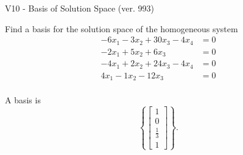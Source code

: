\begin{exercise}
  \begin{exerciseTitle}V10 - Basis of Solution Space (ver. 993)\end{exerciseTitle}
  \begin{exerciseStatement}
    Find a basis for the solution space of the homogeneous system 
\begin{align*}
 -6 x_ 1 -3 x_ 2 + 30 x_ 3 -4 x_ 4 &= 0  \\ 
  -2 x_ 1 + 5 x_ 2 + 6 x_ 3 &= 0  \\ 
  -4 x_ 1 + 2 x_ 2 + 24 x_ 3 -4 x_ 4 &= 0  \\ 
  4 x_ 1 -1 x_ 2 -12 x_ 3 &= 0  \\ 
 \end{align*}


 
  \end{exerciseStatement}

  \begin{exerciseAnswer}
   A basis is   
\[\left\{\left[\begin{array}{c}
1 \\
0 \\
\frac{1}{3} \\
1
\end{array}\right]\right\}.\]

  


  \end{exerciseAnswer}
\end{exercise}